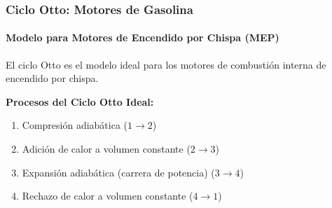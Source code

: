 \documentclass{beamer}
\begin{document}
\begin{frame}
    \frametitle{Ciclo Otto: Motores de Gasolina}
    \framesubtitle{Modelo para Motores de Encendido por Chispa (MEP)}
    
    El ciclo Otto es el modelo ideal para los motores de combustión interna de encendido por chispa.
    
    \textbf{Procesos del Ciclo Otto Ideal:}
    \begin{enumerate}
        \item Compresión adiabática ($1 \rightarrow 2$)
        \item Adición de calor a volumen constante ($2 \rightarrow 3$)
        \item Expansión adiabática (carrera de potencia) ($3 \rightarrow 4$)
        \item Rechazo de calor a volumen constante ($4 \rightarrow 1$)
    \end{enumerate}
    

\end{frame}
\end{document}
